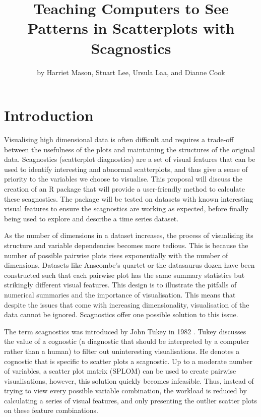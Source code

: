 \title{Teaching Computers to See Patterns in Scatterplots with
Scagnostics}
\author{by Harriet Mason, Stuart Lee, Ursula Laa, and Dianne Cook}

\maketitle


\hypertarget{introduction}{%
\section{Introduction}\label{introduction}}

Visualising high dimensional data is often difficult and requires a
trade-off between the usefulness of the plots and maintaining the
structures of the original data. Scagnostics (scatterplot diagnostics)
are a set of visual features that can be used to identify interesting
and abnormal scatterplots, and thus give a sense of priority to the
variables we choose to visualise. This proposal will discuss the
creation of an R package that will provide a user-friendly method to
calculate these scagnostics. The package will be tested on datasets with
known interesting visual features to ensure the scagnostics are working
as expected, before finally being used to explore and describe a time
series dataset.

As the number of dimensions in a dataset increases, the process of
visualising its structure and variable dependencies becomes more
tedious. This is because the number of possible pairwise plots rises
exponentially with the number of dimensions. Datasets like Anscombe's
quartet \citep{anscombe} or the datasaurus dozen \citep{datasaurpkg}
have been constructed such that each pairwise plot has the same summary
statistics but strikingly different visual features. This design is to
illustrate the pitfalls of numerical summaries and the importance of
visualisation. This means that despite the issues that come with
increasing dimensionality, visualisation of the data cannot be ignored.
Scagnostics offer one possible solution to this issue.

The term scagnostics was introduced by John Tukey in 1982 \citep{tukey}.
Tukey discusses the value of a cognostic (a diagnostic that should be
interpreted by a computer rather than a human) to filter out
uninteresting visualisations. He denotes a cognostic that is specific to
scatter plots a scagnostic. Up to a moderate number of variables, a
scatter plot matrix (SPLOM) can be used to create pairwise
visualisations, however, this solution quickly becomes infeasible. Thus,
instead of trying to view every possible variable combination, the
workload is reduced by calculating a series of visual features, and only
presenting the outlier scatter plots on these feature combinations.

